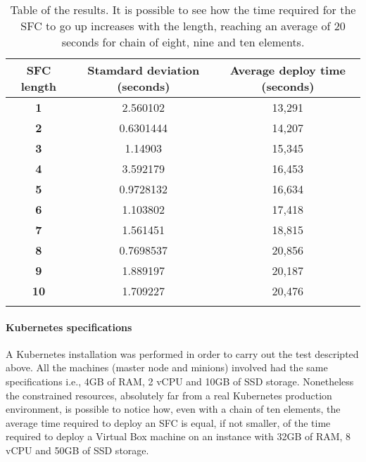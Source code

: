 \begin{longtable}[c]{c|c|c}
\textbf{SFC length} & \textbf{Stamdard deviation (seconds)} & \textbf{Average deploy time (seconds)} \\ \hline
\endhead
%
\textbf{1}          & 2.560102                   & 13,291                       \\
\textbf{2}          & 0.6301444                  & 14,207                       \\
\textbf{3}          & 1.14903                    & 15,345                       \\
\textbf{4}          & 3.592179                   & 16,453                       \\
\textbf{5}          & 0.9728132                  & 16,634                       \\
\textbf{6}          & 1.103802                   & 17,418                       \\
\textbf{7}          & 1.561451                   & 18,815                       \\
\textbf{8}          & 0.7698537                  & 20,856                       \\
\textbf{9}          & 1.889197                   & 20,187                       \\
\textbf{10}         & 1.709227                   & 20,476                       \\
\caption[SFC start up time]{Table of the results. It is possible to see how the
  time required for the SFC to go up increases with the length, reaching an
  average of 20 seconds for chain of eight, nine and ten elements.}
\label{chap:tests:sec:sfclength:tab:sfcdata}\\
\end{longtable}

\newpage

\paragraph*{Kubernetes specifications}
A Kubernetes installation was performed in order to carry out the test
descripted above. All the machines (master node and minions) involved had the
same specifications i.e., 4GB of RAM, 2 vCPU and 10GB of SSD storage.
Nonetheless the constrained resources, absolutely far from a real Kubernetes
production environment, is possible to notice how, even with a chain of ten
elements, the average time required to deploy an SFC is equal, if not smaller,
of the time required to deploy a Virtual Box machine on an instance with 32GB of
RAM, 8 vCPU and 50GB of SSD storage.

